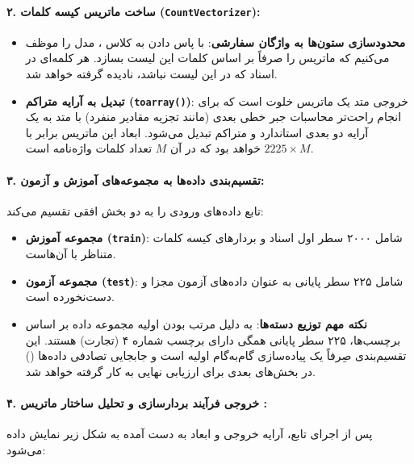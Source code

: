 \documentclass{article}
\begin{document}
    \paragraph{۲. ساخت ماتریس کیسه کلمات (\texttt{CountVectorizer}):}
    \begin{itemize}
        \item \textbf{محدودسازی ستون‌ها به واژگان سفارشی}: با پاس دادن  به کلاس ، مدل را موظف می‌کنیم که ماتریس را صرفاً بر اساس کلمات این لیست بسازد. هر کلمه‌ای در اسناد که در این لیست نباشد، نادیده گرفته خواهد شد.
        \item \textbf{تبدیل به آرایه متراکم (\texttt{toarray()})}: خروجی متد  یک ماتریس خلوت است که برای انجام راحت‌تر محاسبات جبر خطی بعدی (مانند تجزیه مقادیر منفرد) با متد  به یک آرایه دو بعدی استاندارد و متراکم  تبدیل می‌شود. ابعاد این ماتریس برابر با $2225 \times M$ خواهد بود که در آن $M$ تعداد کلمات واژه‌نامه است.
    \end{itemize}

    \paragraph{۳. تقسیم‌بندی داده‌ها به مجموعه‌های آموزش و آزمون:}\hspace{-10pt}
    تابع  داده‌های ورودی را به دو بخش افقی تقسیم می‌کند:
    \begin{itemize}
        \item \textbf{مجموعه آموزش (\texttt{train})}: شامل ۲۰۰۰ سطر اول اسناد و بردارهای کیسه کلمات متناظر با آن‌هاست.
        \item \textbf{مجموعه آزمون (\texttt{test})}: شامل ۲۲۵ سطر پایانی به عنوان داده‌های آزمون مجزا و دست‌نخورده است.
        \item \textbf{نکته مهم توزیع دسته‌ها}: به دلیل مرتب بودن اولیه مجموعه داده بر اساس برچسب‌ها، ۲۲۵ سطر پایانی همگی دارای برچسب شماره ۴ (تجارت) هستند. این تقسیم‌بندی صِرفاً یک پیاده‌سازی گام‌به‌گام اولیه است و جابجایی تصادفی داده‌ها () در بخش‌های بعدی برای ارزیابی نهایی به کار گرفته خواهد شد.
    \end{itemize}

\paragraph{۴. خروجی فرآیند بردارسازی و تحلیل ساختار ماتریس :}\hspace{-10pt}
    پس از اجرای تابع، آرایه خروجی و ابعاد به دست آمده به شکل زیر نمایش داده می‌شود:
\end{document}
